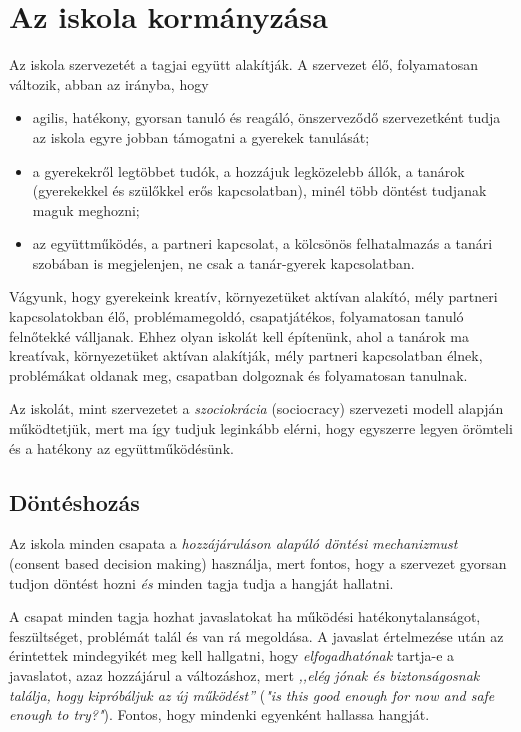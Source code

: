 \section{Az iskola kormányzása}
Az iskola szervezetét a tagjai együtt alakítják. A szervezet élő, folyamatosan változik, abban az irányba, hogy
\begin{itemize}
    \item agilis, hatékony, gyorsan tanuló és reagáló, önszerveződő szervezetként tudja az iskola egyre jobban támogatni a gyerekek tanulását;
    \item a gyerekekről legtöbbet tudók, a hozzájuk legközelebb állók, a tanárok (gyerekekkel és szülőkkel erős kapcsolatban), minél több döntést tudjanak maguk meghozni;
    \item az együttműködés, a partneri kapcsolat, a kölcsönös felhatalmazás a tanári szobában is megjelenjen, ne csak a tanár-gyerek kapcsolatban.
\end{itemize}

Vágyunk, hogy gyerekeink kreatív, környezetüket aktívan alakító, mély partneri kapcsolatokban élő, problémamegoldó, csapatjátékos, folyamatosan tanuló felnőtekké válljanak. Ehhez olyan iskolát kell építenünk, ahol a tanárok ma kreatívak, környezetüket aktívan alakítják, mély partneri kapcsolatban élnek, problémákat oldanak meg, csapatban dolgoznak és folyamatosan tanulnak.

Az iskolát, mint szervezetet 
a \emph{szociokrácia} (sociocracy) szervezeti modell \citep{sociocracy} alapján működtetjük, mert ma így tudjuk leginkább elérni, hogy egyszerre legyen örömteli és a hatékony az együttműködésünk.

\subsection{Döntéshozás}

Az iskola minden csapata a \emph{hozzájáruláson alapúló döntési mechanizmust} (consent based decision making) használja, mert fontos, hogy a szervezet gyorsan tudjon döntést hozni \emph{és} minden tagja tudja a hangját hallatni. 

A csapat minden tagja hozhat javaslatokat ha működési hatékonytalanságot, feszültséget, problémát talál és van rá megoldása. 
A javaslat értelmezése után az érintettek mindegyikét meg kell hallgatni, hogy \emph{elfogadhatónak} tartja-e a javaslatot, azaz hozzájárul a változáshoz, mert \emph{,,elég jónak és biztonságosnak találja, hogy kipróbáljuk az új működést''} (\emph{"is this good enough for now and safe enough to try?"}). Fontos, hogy mindenki egyenként hallassa hangját.

